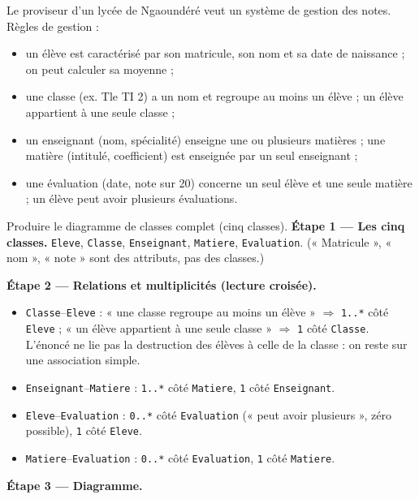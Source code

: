 \documentclass[11pt]{article}
\begin{document}
\begin{exoresolu}
Le proviseur d'un lycée de Ngaoundéré veut un système de gestion des notes. Règles de gestion :
\begin{itemize}
\item un élève est caractérisé par son matricule, son nom et sa date de naissance ; on peut calculer sa moyenne ;
\item une classe (ex. Tle TI 2) a un nom et regroupe au moins un élève ; un élève appartient à une seule classe ;
\item un enseignant (nom, spécialité) enseigne une ou plusieurs matières ; une matière (intitulé, coefficient) est enseignée par un seul enseignant ;
\item une évaluation (date, note sur 20) concerne un seul élève et une seule matière ; un élève peut avoir plusieurs évaluations.
\end{itemize}
Produire le diagramme de classes complet (cinq classes).
\tcblower
\textbf{Étape 1 — Les cinq classes.} \texttt{Eleve}, \texttt{Classe}, \texttt{Enseignant}, \texttt{Matiere}, \texttt{Evaluation}. (« Matricule », « nom », « note » sont des attributs, pas des classes.)

\textbf{Étape 2 — Relations et multiplicités (lecture croisée).}
\begin{itemize}
\item \texttt{Classe}–\texttt{Eleve} : « une classe regroupe au moins un élève » $\Rightarrow$ \texttt{1..*} côté \texttt{Eleve} ; « un élève appartient à une seule classe » $\Rightarrow$ \texttt{1} côté \texttt{Classe}. L'énoncé ne lie pas la destruction des élèves à celle de la classe : on reste sur une association simple.
\item \texttt{Enseignant}–\texttt{Matiere} : \texttt{1..*} côté \texttt{Matiere}, \texttt{1} côté \texttt{Enseignant}.
\item \texttt{Eleve}–\texttt{Evaluation} : \texttt{0..*} côté \texttt{Evaluation} (« peut avoir plusieurs », zéro possible), \texttt{1} côté \texttt{Eleve}.
\item \texttt{Matiere}–\texttt{Evaluation} : \texttt{0..*} côté \texttt{Evaluation}, \texttt{1} côté \texttt{Matiere}.
\end{itemize}

\textbf{Étape 3 — Diagramme.}


\end{exoresolu}
\end{document}
